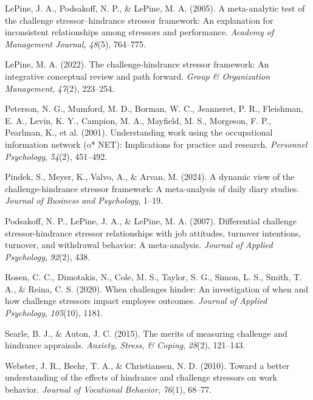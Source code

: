 \documentclass[
  man,mask]{apa7}
\newlength{\cslhangindent}
\newlength{\cslentryspacingunit} %
\newenvironment{CSLReferences}[2] %
 {%
  \setlength{\parindent}{0pt}
  \ifodd #1
  \let\oldpar\par
  \def\par{\hangindent=\cslhangindent\oldpar}
  \fi
  \setlength{\parskip}{#2\cslentryspacingunit}
 }%
 {}
\begin{document}
\begin{CSLReferences}{1}{0}
\leavevmode{}%
LePine, J. A., Podsakoff, N. P., \& LePine, M. A. (2005). A meta-analytic test of the challenge stressor--hindrance stressor framework: An explanation for inconsistent relationships among stressors and performance. \emph{Academy of Management Journal}, \emph{48}(5), 764--775.

\leavevmode{}%
LePine, M. A. (2022). The challenge-hindrance stressor framework: An integrative conceptual review and path forward. \emph{Group \& Organization Management}, \emph{47}(2), 223--254.

\leavevmode{}%
Peterson, N. G., Mumford, M. D., Borman, W. C., Jeanneret, P. R., Fleishman, E. A., Levin, K. Y., Campion, M. A., Mayfield, M. S., Morgeson, F. P., Pearlman, K., et al. (2001). Understanding work using the occupational information network (o* NET): Implications for practice and research. \emph{Personnel Psychology}, \emph{54}(2), 451--492.

\leavevmode{}%
Pindek, S., Meyer, K., Valvo, A., \& Arvan, M. (2024). A dynamic view of the challenge-hindrance stressor framework: A meta-analysis of daily diary studies. \emph{Journal of Business and Psychology}, 1--19.

\leavevmode{}%
Podsakoff, N. P., LePine, J. A., \& LePine, M. A. (2007). Differential challenge stressor-hindrance stressor relationships with job attitudes, turnover intentions, turnover, and withdrawal behavior: A meta-analysis. \emph{Journal of Applied Psychology}, \emph{92}(2), 438.

\leavevmode{}%
Rosen, C. C., Dimotakis, N., Cole, M. S., Taylor, S. G., Simon, L. S., Smith, T. A., \& Reina, C. S. (2020). When challenges hinder: An investigation of when and how challenge stressors impact employee outcomes. \emph{Journal of Applied Psychology}, \emph{105}(10), 1181.

\leavevmode{}%
Searle, B. J., \& Auton, J. C. (2015). The merits of measuring challenge and hindrance appraisals. \emph{Anxiety, Stress, \& Coping}, \emph{28}(2), 121--143.

\leavevmode{}%
Webster, J. R., Beehr, T. A., \& Christiansen, N. D. (2010). Toward a better understanding of the effects of hindrance and challenge stressors on work behavior. \emph{Journal of Vocational Behavior}, \emph{76}(1), 68--77.


\end{CSLReferences}
\end{document}
